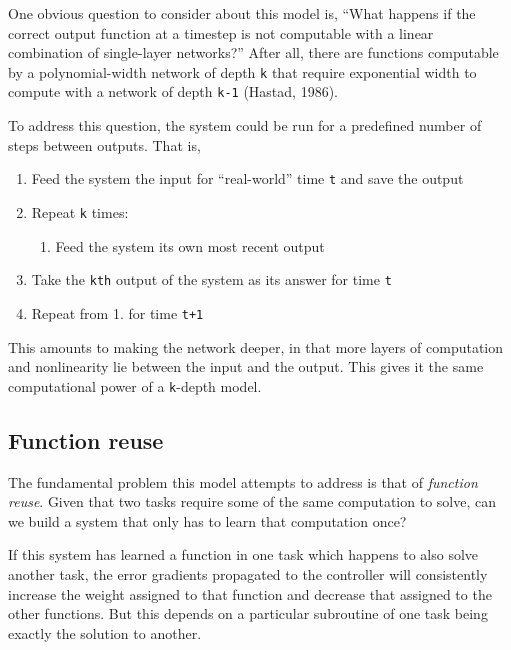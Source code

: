 \documentclass[]{article}
\providecommand{\tightlist}{%
  \setlength{\itemsep}{0pt}\setlength{\parskip}{0pt}}
\begin{document}
One obvious question to consider about this model is, ``What happens if
the correct output function at a timestep is not computable with a
linear combination of single-layer networks?'' After all, there are
functions computable by a polynomial-width network of depth \texttt{k}
that require exponential width to compute with a network of depth
\texttt{k-1} (Hastad, 1986).

To address this question, the system could be run for a predefined
number of steps between outputs. That is,

\begin{enumerate}
\def\labelenumi{\arabic{enumi}.}
\tightlist
\item
  Feed the system the input for ``real-world'' time \texttt{t} and save
  the output
\item
  Repeat \texttt{k} times:

  \begin{enumerate}
  \def\labelenumii{\alph{enumii}.}
  \tightlist
  \item
    Feed the system its own most recent output
  \end{enumerate}
\item
  Take the \texttt{kth} output of the system as its answer for time
  \texttt{t}
\item
  Repeat from 1. for time \texttt{t+1}
\end{enumerate}

This amounts to making the network deeper, in that more layers of
computation and nonlinearity lie between the input and the output. This
gives it the same computational power of a \texttt{k}-depth model.

\subsection{Function reuse}\label{function-reuse}

The fundamental problem this model attempts to address is that of
\emph{function reuse}. Given that two tasks require some of the same
computation to solve, can we build a system that only has to learn that
computation once?

If this system has learned a function in one task which happens to also
solve another task, the error gradients propagated to the controller
will consistently increase the weight assigned to that function and
decrease that assigned to the other functions. But this depends on a
particular subroutine of one task being exactly the solution to another.
\end{document}
